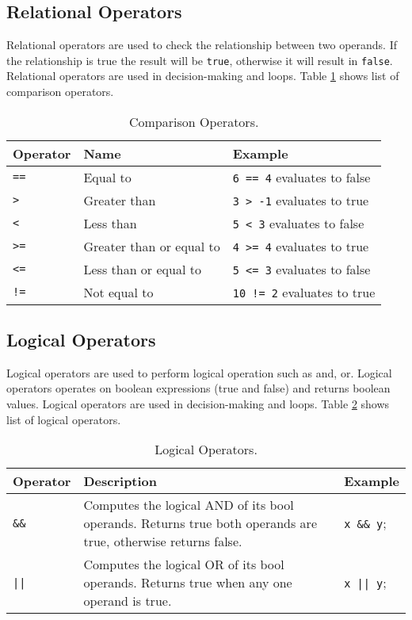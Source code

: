 \subsection{Relational Operators}
Relational operators are used to check the relationship between two operands. If the relationship is true the result will be \verb|true|, otherwise it will result in \verb|false|. Relational operators are used in decision-making and loops. Table {\ref{tab:comparison-operator}} shows list of comparison operators.

\begin{table}[ht!]
	\centering
	\caption{Comparison Operators.}\label{tab:comparison-operator}
	\begin{tabular}{p{1cm}p{3.5cm}p{5cm}}
		\toprule
		\textbf{Operator}     & \textbf{Name}                     & \textbf{Example}  \\ \midrule
		\texttt{==}  & Equal to                 & \texttt{6 == 4} evaluates to false  \\
		\texttt{>}   & Greater than             & \texttt{3 > -1} evaluates to true   \\
		\texttt{< }  & Less than                & \texttt{5 < 3} evaluates to false   \\
		\texttt{>=}  & Greater than or equal to & \texttt{4 >= 4} evaluates to true   \\
		\texttt{<= } & Less than or equal to    & \texttt{5 <= 3} evaluates to false  \\
		\texttt{!=}  & Not equal to             & \texttt{10 != 2} evaluates to true  \\ \bottomrule
	\end{tabular}
\end{table}

\subsection{Logical Operators}
Logical operators are used to perform logical operation such as and, or. Logical operators operates on boolean expressions (true and false) and returns boolean values. Logical operators are used in decision-making and loops. Table {\ref{tab:logical-operator}} shows list of logical operators.

\begin{table}[hb]
	\centering
	\caption{Logical Operators.}\label{tab:logical-operator}
\begin{tabular}{p{1cm}p{6cm}p{3cm}}
	\toprule
	Operator      & Description                                                                                                  & Example            \\ \midrule
	\texttt{\&\&} & Computes the logical AND of its bool operands. Returns true both operands are true, otherwise returns false. & \texttt{x \&\& y}; \\
	\texttt{||}     & Computes the logical OR of its bool operands. Returns true when any one operand is true.                     & \texttt{x || y};    \\ \bottomrule
\end{tabular}
\end{table}

